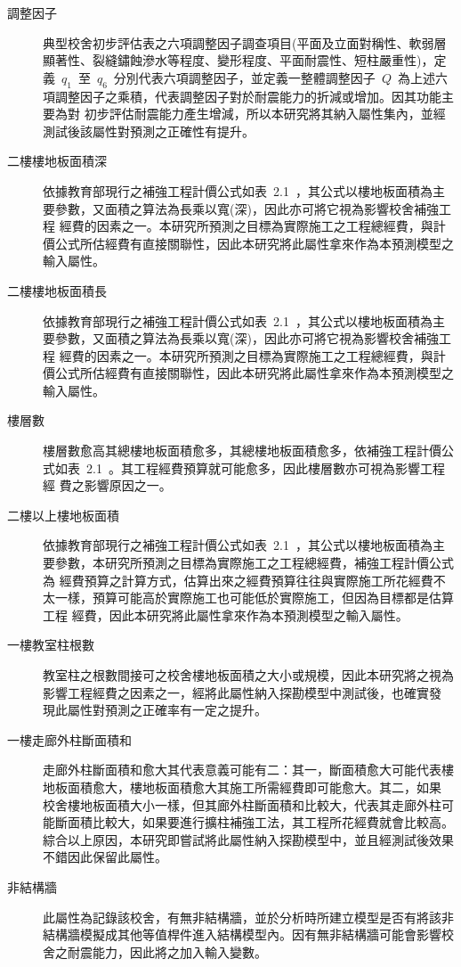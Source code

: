 \begin{description}
  \item[調整因子]
  典型校舍初步評估表之六項調整因子調查項目(平面及立面對稱性、軟弱層顯著性、裂縫鏽蝕滲水等程度、變形程度、平面耐震性、短柱嚴重性)，定義~$q_1$~至~$q_6$~分別代表六項調整因子，並定義一整體調整因子~$Q$~為上述六項調整因子之乘積，代表調整因子對於耐震能力的折減或增加。因其功能主要為對 初步評估耐震能力產生增減，所以本研究將其納入屬性集內，並經測試後該屬性對預測之正確性有提升。
  \item[二樓樓地板面積深]
  依據教育部現行之補強工程計價公式如表~2.1~，其公式以樓地板面積為主要參數，又面積之算法為長乘以寬(深)，因此亦可將它視為影響校舍補強工程 經費的因素之一。本研究所預測之目標為實際施工之工程總經費，與計價公式所估經費有直接關聯性，因此本研究將此屬性拿來作為本預測模型之輸入屬性。
  \item[二樓樓地板面積長]
  依據教育部現行之補強工程計價公式如表~2.1~，其公式以樓地板面積為主要參數，又面積之算法為長乘以寬(深)，因此亦可將它視為影響校舍補強工程 經費的因素之一。本研究所預測之目標為實際施工之工程總經費，與計價公式所估經費有直接關聯性，因此本研究將此屬性拿來作為本預測模型之輸入屬性。
  \item[樓層數]
  樓層數愈高其總樓地板面積愈多，其總樓地板面積愈多，依補強工程計價公式如表~2.1~。其工程經費預算就可能愈多，因此樓層數亦可視為影響工程經 費之影響原因之一。
  \item[二樓以上樓地板面積]
  依據教育部現行之補強工程計價公式如表~2.1~，其公式以樓地板面積為主要參數，本研究所預測之目標為實際施工之工程總經費，補強工程計價公式為 經費預算之計算方式，估算出來之經費預算往往與實際施工所花經費不太一樣，預算可能高於實際施工也可能低於實際施工，但因為目標都是估算工程 經費，因此本研究將此屬性拿來作為本預測模型之輸入屬性。
  \item[一樓教室柱根數]
  教室柱之根數間接可之校舍樓地板面積之大小或規模，因此本研究將之視為影響工程經費之因素之一，經將此屬性納入探勘模型中測試後，也確實發 現此屬性對預測之正確率有一定之提升。
  \item[一樓走廊外柱斷面積和]
  走廊外柱斷面積和愈大其代表意義可能有二：其一，斷面積愈大可能代表樓地板面積愈大，樓地板面積愈大其施工所需經費即可能愈大。其二，如果 校舍樓地板面積大小一樣，但其廊外柱斷面積和比較大，代表其走廊外柱可能斷面積比較大，如果要進行擴柱補強工法，其工程所花經費就會比較高。 綜合以上原因，本研究即嘗試將此屬性納入探勘模型中，並且經測試後效果不錯因此保留此屬性。
  \item[非結構牆]
  此屬性為記錄該校舍，有無非結構牆，並於分析時所建立模型是否有將該非結構牆模擬成其他等值桿件進入結構模型內。因有無非結構牆可能會影響校 舍之耐震能力，因此將之加入輸入變數。

\end{description}
